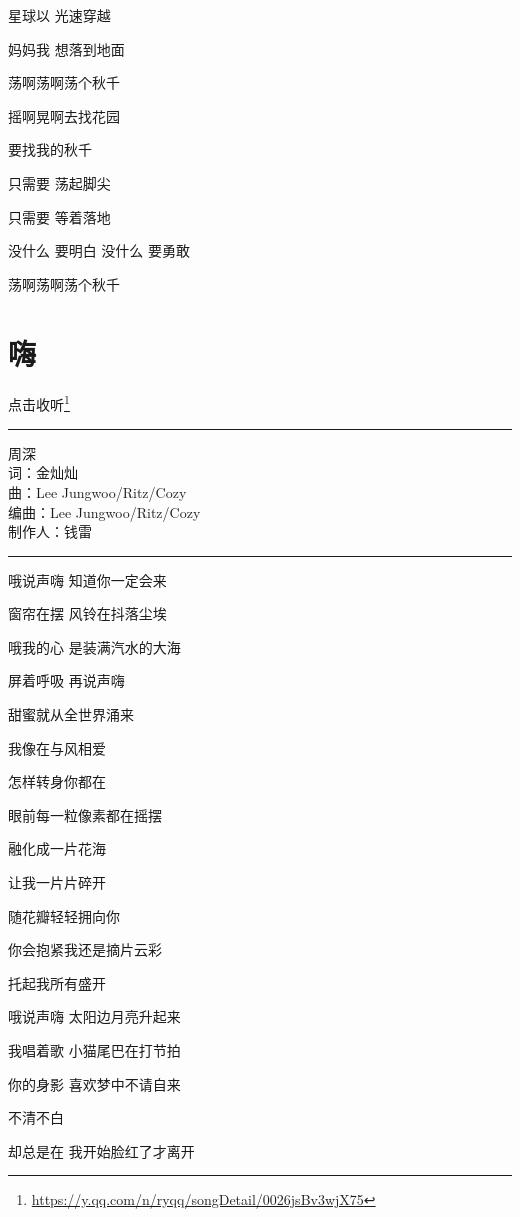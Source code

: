\documentclass[]{ctexbook}
\renewcommand{\href}[2]{#2\footnote{\url{#1}}}
\begin{document}
星球以 光速穿越

妈妈我 想落到地面

荡啊荡啊荡个秋千

摇啊晃啊去找花园

要找我的秋千

只需要 荡起脚尖

只需要 等着落地

没什么 要明白 没什么 要勇敢

荡啊荡啊荡个秋千

\section*{嗨}\label{say-hi}


\href{https://y.qq.com/n/ryqq/songDetail/0026jsBv3wjX75}{点击收听}

\begin{center}\rule{0.5\linewidth}{0.5pt}\end{center}

周深\\
词：金灿灿\\
曲：Lee Jungwoo/Ritz/Cozy\\
编曲：Lee Jungwoo/Ritz/Cozy\\
制作人：钱雷

\begin{center}\rule{0.5\linewidth}{0.5pt}\end{center}

哦说声嗨 知道你一定会来

窗帘在摆 风铃在抖落尘埃

哦我的心 是装满汽水的大海

屏着呼吸 再说声嗨

甜蜜就从全世界涌来

我像在与风相爱

怎样转身你都在

眼前每一粒像素都在摇摆

融化成一片花海

让我一片片碎开

随花瓣轻轻拥向你

你会抱紧我还是摘片云彩

托起我所有盛开

哦说声嗨 太阳边月亮升起来

我唱着歌 小猫尾巴在打节拍

你的身影 喜欢梦中不请自来

不清不白

却总是在 我开始脸红了才离开
\end{document}
